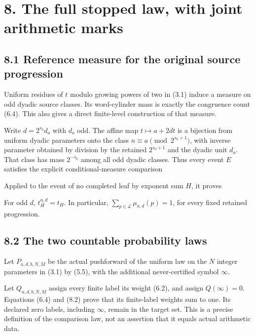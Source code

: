\section{8. The full stopped law, with joint arithmetic marks}

\subsection{8.1 Reference measure for the original source progression}

Uniform residues of \(t\) modulo growing powers of two in (3.1) induce a
measure on odd dyadic source classes. Its word-cylinder mass is exactly
the congruence count (6.4). This also gives a direct finite-level
construction of that measure.

Write \(d=2^{s_0}d_o\) with \(d_o\) odd. The affine map
\(t\mapsto a+2dt\) is a bijection from uniform dyadic parameters onto
the class \(n\equiv a\pmod {2^{s_0+1}}\), with inverse parameter
obtained by division by the retained \(2^{s_0+1}\) and the dyadic unit
\(d_o\). That class has mass \(2^{-s_0}\) among all odd dyadic classes.
Thus every event \(E\) satisfies the explicit conditional-measure
comparison


Applied to the event of no completed leaf by exponent sum \(H\), it
proves


For odd \(d\), \(t_H^{a,d}=t_H\). In particular,
\(\sum_{p\in\mathcal L}\mu_{a,d}(p)=1\), for every fixed retained
progression.

\subsection{8.2 The two countable probability laws}

Let \(P_{a,d,b,N,M}\) be the actual pushforward of the uniform law on
the \(N\) integer parameters in (3.1) by (5.5), with the additional
never-certified symbol \(\infty\).

Let \(Q_{a,d,b,N,M}\) assign every finite label its weight (6.2), and
assign \(Q(\infty)=0\). Equations (6.4) and (8.2) prove that its
finite-label weights sum to one. Its declared zero labels, including
\(\infty\), remain in the target set. This is a precise definition of
the comparison law, not an assertion that it equals actual arithmetic
data.

